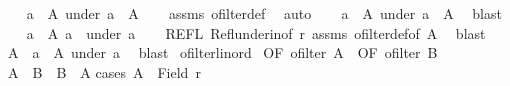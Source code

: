 \begin{isabellebody}
%
\isadelimproof
%
\endisadelimproof
%
\isatagproof
{}\isamarkupfalse%
\isanewline
\ \ \isamarkupfalse%
\ {\isachardoublequoteopen}{\isasymforall}a\ {\isasymin}\ A{\isachardot}{\kern0pt}\ under\ a\ {\isasymle}\ A{\isachardoublequoteclose}\isanewline
\ \ \isamarkupfalse%
\ assms\ ofilter{\isacharunderscore}{\kern0pt}def\ \isamarkupfalse%
\ auto\isanewline
\ \ \isamarkupfalse%
\ {\isachardoublequoteopen}{\isacharparenleft}{\kern0pt}{\isasymUnion}a\ {\isasymin}\ A{\isachardot}{\kern0pt}\ under\ a{\isacharparenright}{\kern0pt}\ {\isasymle}\ A{\isachardoublequoteclose}\ \isamarkupfalse%
\ blast\isanewline
{}\isamarkupfalse%
\isanewline
\ \ \isamarkupfalse%
\ {\isachardoublequoteopen}{\isasymforall}a\ {\isasymin}\ A{\isachardot}{\kern0pt}\ a\ {\isasymin}\ under\ a{\isachardoublequoteclose}\isanewline
\ \ \isamarkupfalse%
\ REFL\ Refl{\isacharunderscore}{\kern0pt}under{\isacharunderscore}{\kern0pt}in{\isacharbrackleft}{\kern0pt}of\ r{\isacharbrackright}{\kern0pt}\ assms\ ofilter{\isacharunderscore}{\kern0pt}def{\isacharbrackleft}{\kern0pt}of\ A{\isacharbrackright}{\kern0pt}\ \isamarkupfalse%
\ blast\isanewline
\ \ \isamarkupfalse%
\ {\isachardoublequoteopen}A\ {\isasymle}\ {\isacharparenleft}{\kern0pt}{\isasymUnion}a\ {\isasymin}\ A{\isachardot}{\kern0pt}\ under\ a{\isacharparenright}{\kern0pt}{\isachardoublequoteclose}\ \isamarkupfalse%
\ blast\isanewline
{}\isamarkupfalse%
%
\endisatagproof
{\isafoldproof}%
%
\isadelimproof
%
\endisadelimproof
%
\isadelimdocument
%
\endisadelimdocument
%
\isatagdocument
%
\isamarkuptrue%
%
\endisatagdocument
{\isafolddocument}%
%
\isadelimdocument
%
\endisadelimdocument
{}\isamarkupfalse%
\ ofilter{\isacharunderscore}{\kern0pt}linord{\isacharcolon}{\kern0pt}\isanewline
{}\ OF{}{\isacharcolon}{\kern0pt}\ {\isachardoublequoteopen}ofilter\ A{\isachardoublequoteclose}\ \ OF{}{\isacharcolon}{\kern0pt}\ {\isachardoublequoteopen}ofilter\ B{\isachardoublequoteclose}\isanewline
{}\ {\isachardoublequoteopen}A\ {\isasymle}\ B\ {\isasymor}\ B\ {\isasymle}\ A{\isachardoublequoteclose}\isanewline
%
\isadelimproof
%
\endisadelimproof
%
\isatagproof
{}\isamarkupfalse%
{\isacharparenleft}{\kern0pt}cases\ {\isachardoublequoteopen}A\ {\isacharequal}{\kern0pt}\ Field\ r{\isachardoublequoteclose}{\isacharparenright}{\kern0pt}\isanewline

\end{isabellebody}
